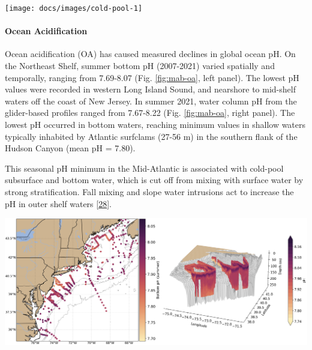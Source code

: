 \documentclass[
  10pt,
]{article}
\let\origfigure\figure
\let\endorigfigure\endfigure
\renewenvironment{figure}[1][2] {
    \expandafter\origfigure\expandafter[H]
} {
    \endorigfigure
}
\begin{document}
\begin{figure}

{\centering \texttt{[image: docs/images/cold-pool-1]} 

}

\caption{Cold pool indices: Temperature, persistence, and spatial extent}\label{fig:cold-pool}
\end{figure}

\hypertarget{ocean-acidification}{%
\paragraph{Ocean Acidification}\label{ocean-acidification}}

Ocean acidification (OA) has caused measured declines in global ocean
pH. On the Northeast Shelf, summer bottom pH (2007-2021) varied
spatially and temporally, ranging from 7.69-8.07 (Fig. \ref{fig:mab-oa},
left panel). The lowest pH values were recorded in western Long Island
Sound, and nearshore to mid-shelf waters off the coast of New Jersey. In
summer 2021, water column pH from the glider-based profiles ranged from
7.67-8.22 (Fig. \ref{fig:mab-oa}, right panel). The lowest pH occurred
in bottom waters, reaching minimum values in shallow waters typically
inhabited by Atlantic surfclams (27-56 m) in the southern flank of the
Hudson Canyon (mean pH = 7.80).

This seasonal pH minimum in the Mid-Atlantic is associated with
cold-pool subsurface and bottom water, which is cut off from mixing with
surface water by strong stratification. Fall mixing and slope water
intrusions act to increase the pH in outer shelf waters
{[}\protect\hyperlink{ref-wrightfairbanks_autonomous_2020}{28}{]}.

\begin{figure}

{\centering \includegraphics[width=0.8\linewidth]{images/Saba_Fig_SOE_MAFMC - Grace Saba} 

}

\caption{Left: Summer bottom pH collated from all quality-controlled vessel- and glider-based measurements from 2007-2021 Right: Glider-based pH profiles collected during summer 2021 in the Mid-Atlantic}\label{fig:mab-oa}
\end{figure}
\end{document}
